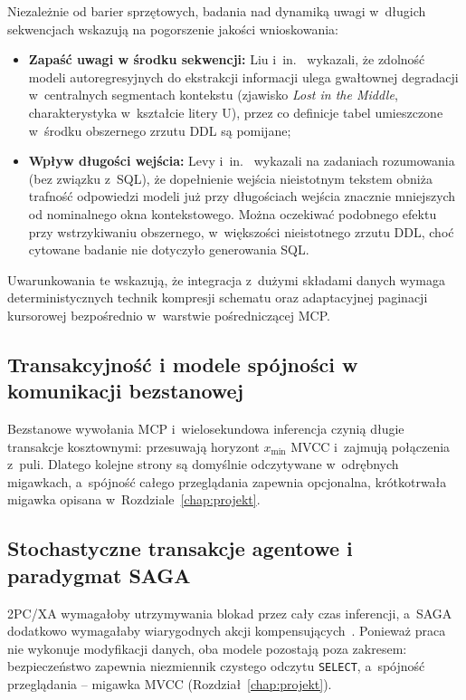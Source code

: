 Niezależnie od barier sprzętowych, badania nad dynamiką uwagi w~długich sekwencjach wskazują na pogorszenie jakości wnioskowania:
\begin{itemize}
    \item \textbf{Zapaść uwagi w środku sekwencji:} Liu i~in.~\cite{liu2024lostinthemiddle} wykazali, że zdolność modeli autoregresyjnych do ekstrakcji informacji ulega gwałtownej degradacji w~centralnych segmentach kontekstu (zjawisko \emph{Lost in the Middle}, charakterystyka w~kształcie litery U), przez co definicje tabel umieszczone w~środku obszernego zrzutu DDL są pomijane;
    \item \textbf{Wpływ długości wejścia:} Levy i~in.~\cite{levy2024same} wykazali na zadaniach rozumowania (bez związku z~SQL), że dopełnienie wejścia nieistotnym tekstem obniża trafność odpowiedzi modeli już przy długościach wejścia znacznie mniejszych od nominalnego okna kontekstowego. Można oczekiwać podobnego efektu przy wstrzykiwaniu obszernego, w~większości nieistotnego zrzutu DDL, choć cytowane badanie nie dotyczyło generowania SQL.
\end{itemize}
Uwarunkowania te wskazują, że integracja z~dużymi składami danych wymaga deterministycznych technik kompresji schematu oraz adaptacyjnej paginacji kursorowej bezpośrednio w~warstwie pośredniczącej MCP.

\subsection{Transakcyjność i modele spójności w komunikacji bezstanowej}
\label{subsec:teoria_acid_base_cap}

Bezstanowe wywołania MCP i~wielosekundowa inferencja czynią długie transakcje kosztownymi: przesuwają horyzont $x_{\text{min}}$ MVCC i~zajmują połączenia z~puli. Dlatego kolejne strony są domyślnie odczytywane w~odrębnych migawkach, a~spójność całego przeglądania zapewnia opcjonalna, krótkotrwała migawka opisana w~Rozdziale~\ref{chap:projekt}.

\subsection{Stochastyczne transakcje agentowe i paradygmat SAGA}
\label{subsec:teoria_transakcje_stochastyczne}

2PC/XA wymagałoby utrzymywania blokad przez cały czas inferencji, a~SAGA dodatkowo wymagałaby wiarygodnych akcji kompensujących~\cite{gray1978notes,garcia1987sagas}. Ponieważ praca nie wykonuje modyfikacji danych, oba modele pozostają poza zakresem: bezpieczeństwo zapewnia niezmiennik czystego odczytu \texttt{SELECT}, a~spójność przeglądania -- migawka MVCC (Rozdział~\ref{chap:projekt}).

